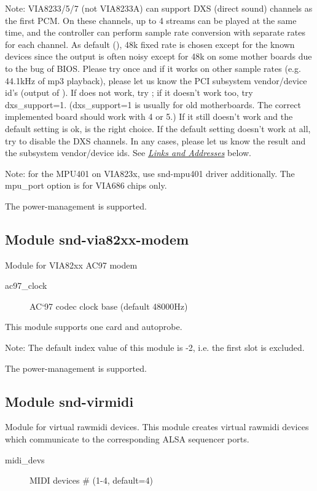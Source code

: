 \documentclass[a4paper,8pt,english]{sphinxmanual}
\begin{document}
Note: VIA8233/5/7 (not VIA8233A) can support DXS (direct sound)
channels as the first PCM.  On these channels, up to 4
streams can be played at the same time, and the controller
can perform sample rate conversion with separate rates for
each channel.
As default (), 48k fixed rate is chosen
except for the known devices since the output is often
noisy except for 48k on some mother boards due to the
bug of BIOS.
Please try once  and if it works on other
sample rates (e.g. 44.1kHz of mp3 playback), please let us
know the PCI subsystem vendor/device id's (output of
).
If  does not work, try ; if it
doesn't work too, try dxs\_support=1.  (dxs\_support=1 is
usually for old motherboards.  The correct implemented
board should work with 4 or 5.)  If it still doesn't
work and the default setting is ok,  is the
right choice.  If the default setting doesn't work at all,
try  to disable the DXS channels.
In any cases, please let us know the result and the
subsystem vendor/device ids.  See {\hyperref[sound/alsa\string-configuration:links\string-and\string-addresses]{\emph{Links and Addresses}}}
below.

Note: for the MPU401 on VIA823x, use snd-mpu401 driver
additionally.  The mpu\_port option is for VIA686 chips only.

The power-management is supported.


\subsection{Module snd-via82xx-modem}
\label{sound/alsa-configuration:module-snd-via82xx-modem}
Module for VIA82xx AC97 modem
\begin{description}
\item[{ac97\_clock}] \leavevmode
AC`97 codec clock base (default 48000Hz)

\end{description}

This module supports one card and autoprobe.

Note: The default index value of this module is -2, i.e. the first
slot is excluded.

The power-management is supported.


\subsection{Module snd-virmidi}
\label{sound/alsa-configuration:module-snd-virmidi}
Module for virtual rawmidi devices.
This module creates virtual rawmidi devices which communicate
to the corresponding ALSA sequencer ports.
\begin{description}
\item[{midi\_devs}] \leavevmode
MIDI devices \# (1-4, default=4)

\end{description}
\end{document}
